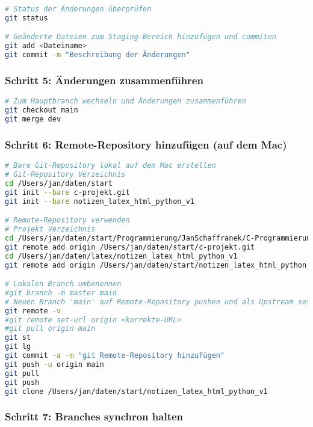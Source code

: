 \documentclass{vorlage-design-main}
\begin{document}
\begin{lstlisting}[language=bash]
# Status der Änderungen überprüfen
git status

# Geänderte Dateien zum Staging-Bereich hinzufügen und commiten
git add <Dateiname>
git commit -m "Beschreibung der Änderungen"
\end{lstlisting}

\hypertarget{schritt-5-uxe4nderungen-zusammenfuxfchren}{%
\subsubsection{Schritt 5: Änderungen
zusammenführen}\label{schritt-5-aenderungen-zusammenfuehren}}

\begin{lstlisting}[language=bash]
# Zum Hauptbranch wechseln und Änderungen zusammenführen
git checkout main
git merge dev
\end{lstlisting}

\hypertarget{schritt-6-remote-repository-hinzufuxfcgen-auf-dem-mac}{%
\subsubsection{Schritt 6: Remote-Repository hinzufügen (auf dem
Mac)}\label{schritt-6-remote-repository-hinzufuegen-auf-dem-mac}}

\begin{lstlisting}[language=bash]
# Bare Git-Repository lokal auf dem Mac erstellen
# Git-Repository Verzeichnis
cd /Users/jan/daten/start
git init --bare c-projekt.git
git init --bare notizen_latex_html_python_v1

# Remote-Repository verwenden
# Projekt Verzeichnis
cd /Users/jan/daten/start/Programmierung/JanSchaffranek/C-Programmierung/c-projekte
git remote add origin /Users/jan/daten/start/c-projekt.git
cd /Users/jan/daten/latex/notizen_latex_html_python_v1
git remote add origin /Users/jan/daten/start/notizen_latex_html_python_v1

# Lokalen Branch umbenennen
#git branch -m master main
# Neuen Branch 'main' auf Remote-Repository pushen und als Upstream setzen
git remote -v
#git remote set-url origin <korrekte-URL>
#git pull origin main
git st
git lg
git commit -a -m "git Remote-Repository hinzufügen"
git push -u origin main
git pull
git push
git clone /Users/jan/daten/start/notizen_latex_html_python_v1
\end{lstlisting}

\hypertarget{schritt-7-branches-synchron-halten}{%
\subsubsection{Schritt 7: Branches synchron
halten}\label{schritt-7-branches-synchron-halten}}
\end{document}
